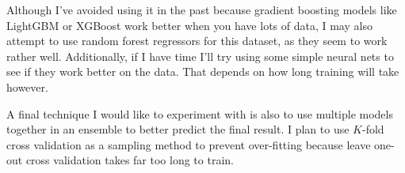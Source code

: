\documentclass[11pt]{article}
\begin{document}
Although I've avoided using it in the past because gradient boosting models like LightGBM or
XGBoost work better when you have lots of data, I may also attempt to use random forest regressors 
for this dataset, as they seem to work rather well.\cite{lepelaars} Additionally, if I have time
I'll try using some simple neural nets to see if they work better on the data. That depends on how
long training will take however.

A final technique I would like to experiment with is also to use multiple models together in an
ensemble to better predict the final result. I plan to use $K$-fold cross validation as a sampling
method to prevent over-fitting because leave one-out cross validation takes far too long to train.

\printbibliography
\end{document}

